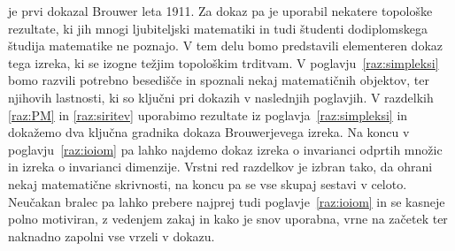 \documentclass[mat1]{fmfdelo}
\newcommand{\0}{\underline{0}}
\begin{document}
je prvi dokazal Brouwer leta 1911. Za dokaz pa je uporabil nekatere topološke rezultate, ki jih mnogi ljubiteljski matematiki in tudi študenti dodiplomskega študija matematike ne poznajo. 
V tem delu bomo predstavili elementeren dokaz tega izreka, ki se izogne težjim topološkim trditvam. V poglavju~\ref{raz:simpleksi} bomo razvili potrebno besedišče in spoznali nekaj matematičnih objektov, ter njihovih lastnosti, ki so ključni pri dokazih v naslednjih poglavjih.  V razdelkih \ref{raz:PM} in \ref{raz:siritev} uporabimo rezultate iz poglavja~\ref{raz:simpleksi} in dokažemo dva ključna gradnika dokaza Brouwerjevega izreka. Na koncu v poglavju~\ref{raz:ioiom} pa lahko najdemo dokaz izreka o invarianci odprtih množic in izreka o invarianci dimenzije. Vrstni red razdelkov je izbran tako, da ohrani nekaj matematične skrivnosti, na koncu pa se vse skupaj sestavi v celoto. Neučakan bralec pa lahko prebere najprej tudi poglavje~\ref{raz:ioiom} in se kasneje polno motiviran, z vedenjem zakaj in kako je snov uporabna, vrne na začetek ter naknadno zapolni vse vrzeli v dokazu.

\end{document}
